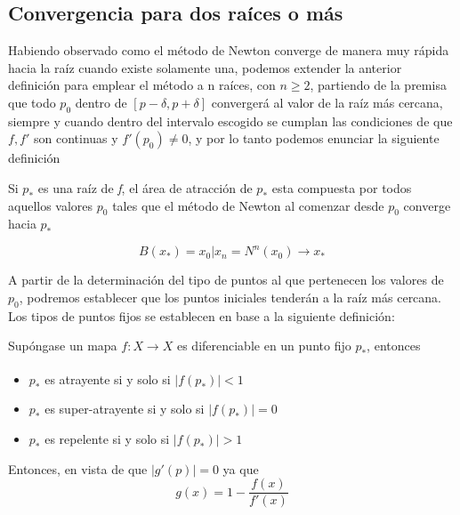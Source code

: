 \subsection{Convergencia para dos raíces o más}

Habiendo observado como el método de Newton converge de manera muy rápida hacia la raíz cuando existe solamente una, podemos extender la anterior definición para emplear el método a n raíces, con $n \geq 2$, partiendo de la premisa que todo $p_0$ dentro de $[p-\delta, p+\delta]$ convergerá al valor de la raíz más cercana, siempre y cuando dentro del intervalo escogido se cumplan las condiciones de que $f,f'$ son continuas y $f'(p_0) \neq 0$, y por lo tanto podemos enunciar la siguiente definición

\begin{definition}

Si $p_*$ es una raíz de \textit{f}, el área de atracción de $p_*$ esta compuesta por todos aquellos valores $p_0$ tales que el método de Newton al comenzar desde $p_0$ converge hacia $p_*$

\begin{displaymath}
B(x_*) = {x_0|x_n =  N^n(x_0) \xrightarrow{}  x_*}
\end{displaymath}

\end{definition}

A partir de la determinación del tipo de puntos al que pertenecen los valores de $p_0$, podremos establecer que los puntos iniciales tenderán a la raíz más cercana. 
Los tipos de puntos fijos se establecen en base a la siguiente definición:

\begin{definition}
 Supóngase un mapa $f: X \xrightarrow[]{}X$ es diferenciable en un punto fijo $p_*$, entonces
 \begin{itemize}
     \item $p_*$ es atrayente si y solo si $|f(p_*)|<1$
     \item $p_*$ es super-atrayente si y solo si $|f(p_*)|=0$
     \item $p_*$ es repelente si y solo si $|f(p_*)|>1$
 \end{itemize}
\end{definition}

Entonces, en vista de que $|g'(p)| = 0$ ya que 
\begin{displaymath}
     g(x)= 1 - \frac{f(x)}{f'(x)} 
\end{displaymath}

